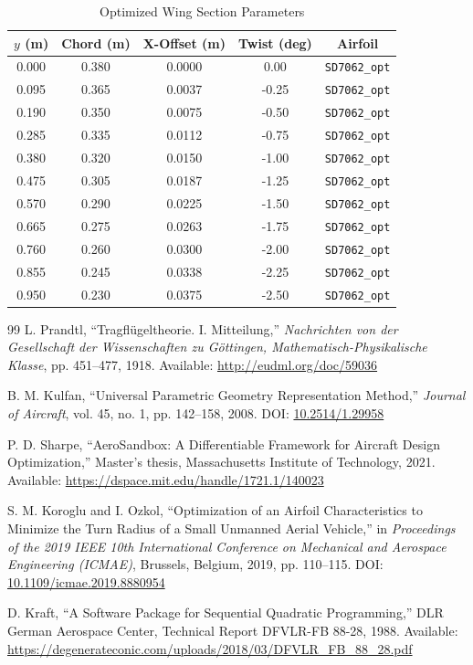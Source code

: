 \documentclass[11pt]{article}
\begin{document}
\begin{table}[h]
\centering
\caption{Optimized Wing Section Parameters}
\label{tab:geometry}
\begin{tabular}{ccccc}
\toprule
$y$ (m) & Chord (m) & X-Offset (m) & Twist (deg) & Airfoil \\
\midrule
0.000 & 0.380 & 0.0000 & 0.00 & \texttt{SD7062\_opt} \\
0.095 & 0.365 & 0.0037 & -0.25 & \texttt{SD7062\_opt} \\
0.190 & 0.350 & 0.0075 & -0.50 & \texttt{SD7062\_opt} \\
0.285 & 0.335 & 0.0112 & -0.75 & \texttt{SD7062\_opt} \\
0.380 & 0.320 & 0.0150 & -1.00 & \texttt{SD7062\_opt} \\
0.475 & 0.305 & 0.0187 & -1.25 & \texttt{SD7062\_opt} \\
0.570 & 0.290 & 0.0225 & -1.50 & \texttt{SD7062\_opt} \\
0.665 & 0.275 & 0.0263 & -1.75 & \texttt{SD7062\_opt} \\
0.760 & 0.260 & 0.0300 & -2.00 & \texttt{SD7062\_opt} \\
0.855 & 0.245 & 0.0338 & -2.25 & \texttt{SD7062\_opt} \\
0.950 & 0.230 & 0.0375 & -2.50 & \texttt{SD7062\_opt} \\
\bottomrule
\end{tabular}
\end{table}

\begin{thebibliography}{99}
L. Prandtl, ``Tragfl\"ugeltheorie. I. Mitteilung,'' \textit{Nachrichten von der Gesellschaft der Wissenschaften zu G\"ottingen, Mathematisch-Physikalische Klasse}, pp. 451--477, 1918. Available: \url{http://eudml.org/doc/59036}

B. M. Kulfan, ``Universal Parametric Geometry Representation Method,'' \textit{Journal of Aircraft}, vol. 45, no. 1, pp. 142--158, 2008. DOI: \href{https://doi.org/10.2514/1.29958}{10.2514/1.29958}

P. D. Sharpe, ``AeroSandbox: A Differentiable Framework for Aircraft Design Optimization,'' Master's thesis, Massachusetts Institute of Technology, 2021. Available: \url{https://dspace.mit.edu/handle/1721.1/140023}

S. M. Koroglu and I. Ozkol, ``Optimization of an Airfoil Characteristics to Minimize the Turn Radius of a Small Unmanned Aerial Vehicle,'' in \textit{Proceedings of the 2019 IEEE 10th International Conference on Mechanical and Aerospace Engineering (ICMAE)}, Brussels, Belgium, 2019, pp. 110--115. DOI: \href{https://doi.org/10.1109/icmae.2019.8880954}{10.1109/icmae.2019.8880954}

D. Kraft, ``A Software Package for Sequential Quadratic Programming,'' DLR German Aerospace Center, Technical Report DFVLR-FB 88-28, 1988. Available: \url{https://degenerateconic.com/uploads/2018/03/DFVLR_FB_88_28.pdf}
\end{thebibliography}
\end{document}
